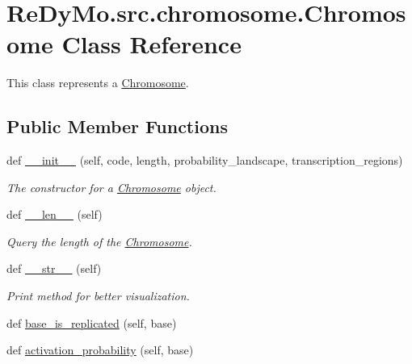 \hypertarget{classReDyMo_1_1src_1_1chromosome_1_1Chromosome}{}\section{Re\+Dy\+Mo.\+src.\+chromosome.\+Chromosome Class Reference}
\label{classReDyMo_1_1src_1_1chromosome_1_1Chromosome}


This class represents a \mbox{\hyperlink{classReDyMo_1_1src_1_1chromosome_1_1Chromosome}{Chromosome}}.  


\subsection*{Public Member Functions}
\begin{DoxyCompactItemize}
\item 
def \mbox{\hyperlink{classReDyMo_1_1src_1_1chromosome_1_1Chromosome_a23a1edc86d3d3cd3d8284911a66271f5}{\+\_\+\+\_\+init\+\_\+\+\_\+}} (self, code, length, probability\+\_\+landscape, transcription\+\_\+regions)
\begin{DoxyCompactList}\small\item\em The constructor for a \mbox{\hyperlink{classReDyMo_1_1src_1_1chromosome_1_1Chromosome}{Chromosome}} object. \end{DoxyCompactList}\item 
def \mbox{\hyperlink{classReDyMo_1_1src_1_1chromosome_1_1Chromosome_a2af2acd01f59ca72cdfc8e714f9bc3f8}{\+\_\+\+\_\+len\+\_\+\+\_\+}} (self)
\begin{DoxyCompactList}\small\item\em Query the length of the \mbox{\hyperlink{classReDyMo_1_1src_1_1chromosome_1_1Chromosome}{Chromosome}}. \end{DoxyCompactList}\item 
def \mbox{\hyperlink{classReDyMo_1_1src_1_1chromosome_1_1Chromosome_a95d9a66f3651a2e6ac0f7141f966c17d}{\+\_\+\+\_\+str\+\_\+\+\_\+}} (self)
\begin{DoxyCompactList}\small\item\em Print method for better visualization. \end{DoxyCompactList}\item 
def \mbox{\hyperlink{classReDyMo_1_1src_1_1chromosome_1_1Chromosome_a1dba7152914a8f8006a5ddfcaad82c31}{base\+\_\+is\+\_\+replicated}} (self, base)
\item 
def \mbox{\hyperlink{classReDyMo_1_1src_1_1chromosome_1_1Chromosome_ae1793cc7315be7cffaf4c1ab9385ba89}{activation\+\_\+probability}} (self, base)

\end{DoxyCompactItemize}
